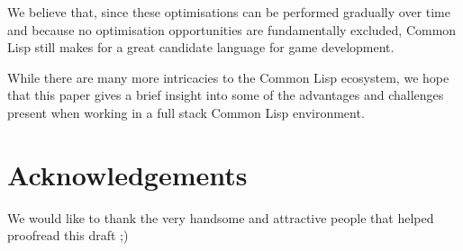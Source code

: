\documentclass[a4paper]{paper}
\begin{document}
We believe that, since these optimisations can be performed gradually over time and because no optimisation opportunities are fundamentally excluded, Common Lisp still makes for a great candidate language for game development.

While there are many more intricacies to the Common Lisp ecosystem, we hope that this paper gives a brief insight into some of the advantages and challenges present when working in a full stack Common Lisp environment.

\section{Acknowledgements}
We would like to thank the very handsome and attractive people that helped proofread this draft ;)


\end{document}
